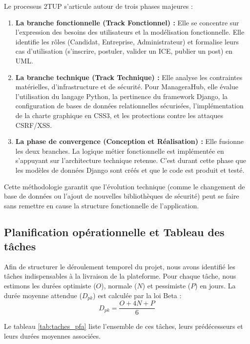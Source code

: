 Le processus 2TUP s'articule autour de trois phases majeures :
\begin{enumerate}
    \item \textbf{La branche fonctionnelle (Track Fonctionnel) :} Elle se concentre sur l'expression des besoins des utilisateurs et la modélisation fonctionnelle. Elle identifie les rôles (Candidat, Entreprise, Administrateur) et formalise leurs cas d'utilisation (s'inscrire, postuler, valider un ICE, publier un post) en UML.
    \item \textbf{La branche technique (Track Technique) :} Elle analyse les contraintes matérielles, d'infrastructure et de sécurité. Pour ManageraHub, elle évalue l'utilisation du langage Python, la pertinence du framework Django, la configuration de bases de données relationnelles sécurisées, l'implémentation de la charte graphique en CSS3, et les protections contre les attaques CSRF/XSS.
    \item \textbf{La phase de convergence (Conception et Réalisation) :} Elle fusionne les deux branches. La logique métier fonctionnelle est implémentée en s'appuyant sur l'architecture technique retenue. C'est durant cette phase que les modèles de données Django sont créés et que le code est produit et testé.
\end{enumerate}

Cette méthodologie garantit que l'évolution technique (comme le changement de base de données ou l'ajout de nouvelles bibliothèques de sécurité) peut se faire sans remettre en cause la structure fonctionnelle de l'application.

\subsection{Planification opérationnelle et Tableau des tâches}
Afin de structurer le déroulement temporel du projet, nous avons identifié les tâches indispensables à la livraison de la plateforme. Pour chaque tâche, nous estimons les durées optimiste ($O$), normale ($N$) et pessimiste ($P$) en jours. La durée moyenne attendue ($D_{pk}$) est calculée par la loi Beta :
\begin{equation}
D_{pk} = \frac{O + 4N + P}{6}
\end{equation}

Le tableau \ref{tab:taches_pfa} liste l'ensemble de ces tâches, leurs prédécesseurs et leurs durées moyennes associées.


